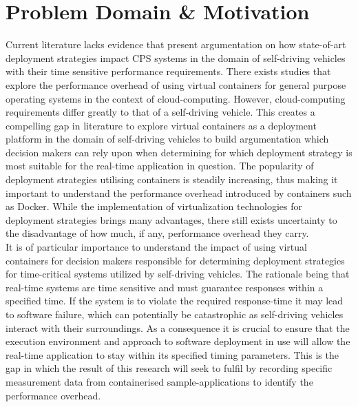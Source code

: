 
\section{Problem Domain \& Motivation}

Current literature lacks evidence that present argumentation on how state-of-art deployment strategies impact CPS systems in the domain of self-driving vehicles with their time sensitive performance requirements. There exists studies that explore the performance overhead of using virtual containers for general purpose operating systems in the context of cloud-computing. However, cloud-computing requirements differ greatly to that of a self-driving vehicle. This creates a compelling gap in literature to explore virtual containers as a deployment platform in the domain of self-driving vehicles to build argumentation which decision makers can rely upon when determining for which deployment strategy is most suitable for the real-time application in question. The popularity of deployment strategies utilising containers is steadily increasing, thus making it important to understand the performance overhead introduced by containers such as Docker. While the implementation of virtualization technologies for deployment strategies brings many advantages, there still exists uncertainty to the disadvantage of how much, if any, performance overhead they carry.\\

It is of particular importance to understand the impact of using virtual containers for decision makers responsible for determining deployment strategies for time-critical systems utilized by self-driving vehicles. The rationale being that real-time systems are time sensitive and must guarantee responses within a specified time. If the system is to violate the required response-time it may lead to software failure, which can potentially be catastrophic as self-driving vehicles interact with their surroundings. As a consequence it is crucial to ensure that the execution environment and approach to software deployment in use will allow the real-time application to stay within its specified timing parameters. This is the gap in which the result of this research will seek to fulfil by recording specific measurement data from containerised sample-applications to identify the performance overhead.

